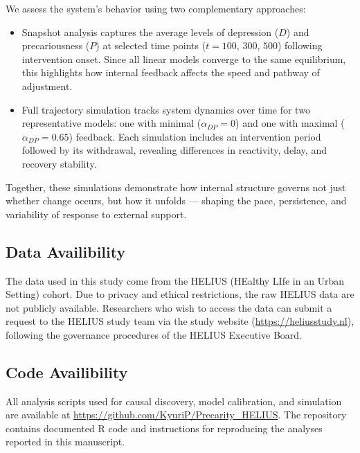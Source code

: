 \documentclass[
]{article}
\begin{document}
We assess the system's behavior using two complementary approaches:

\begin{itemize}
\item
  Snapshot analysis captures the average levels of depression (\(D\))
  and precariousness (\(P\)) at selected time points (\(t = 100\),
  \(300\), \(500\)) following intervention onset. Since all linear
  models converge to the same equilibrium, this highlights how internal
  feedback affects the speed and pathway of adjustment.
\item
  Full trajectory simulation tracks system dynamics over time for two
  representative models: one with minimal (\(\alpha_{DP} = 0\)) and one
  with maximal (\(\alpha_{DP} = 0.65\)) feedback. Each simulation
  includes an intervention period followed by its withdrawal, revealing
  differences in reactivity, delay, and recovery stability.
\end{itemize}

Together, these simulations demonstrate how internal structure governs
not just whether change occurs, but how it unfolds --- shaping the pace,
persistence, and variability of response to external support.

\subsection*{Data Availibility}\label{data-availibility}

The data used in this study come from the HELIUS (HEalthy LIfe in an
Urban Setting) cohort. Due to privacy and ethical restrictions, the raw
HELIUS data are not publicly available. Researchers who wish to access
the data can submit a request to the HELIUS study team via the study
website (\url{https://heliusstudy.nl}), following the governance
procedures of the HELIUS Executive Board.

\subsection*{Code Availibility}\label{code-availibility}

All analysis scripts used for causal discovery, model calibration, and
simulation are available at
\url{https://github.com/KyuriP/Precarity_HELIUS}. The repository
contains documented R code and instructions for reproducing the analyses
reported in this manuscript.
\end{document}
